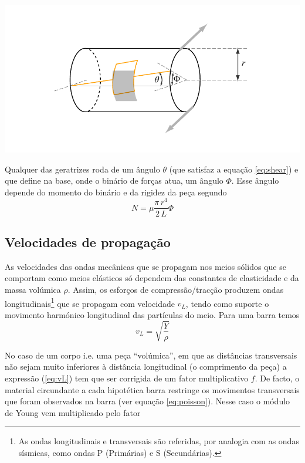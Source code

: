 \documentclass[a4paper,12pt]{article}
\begin{document}
\begin{center}
	\includegraphics[width=0.7\linewidth]{rotac2}
\end{center}

Qualquer das geratrizes roda de um ângulo $\theta$ (que satisfaz a equação 	\ref{eq:shear}) e que define na base, onde o binário de forças atua, um ângulo $\Phi$. Esse ângulo depende do momento do binário e da rigidez da peça segundo 
\begin{equation}
	\label{eq:binario}
	 N= \mu \frac{\pi\,r^4}{2\,L} \Phi 
\end{equation}

\subsection{\sf Velocidades de propagação  }

As velocidades das ondas mecânicas que se propagam nos meios sólidos que se comportam como meios elásticos só dependem das constantes de elasticidade e da massa volúmica $\rho$.
Assim, os esforços de compressão/tracção produzem ondas longitudinais\footnote{As ondas longitudinais e transversais são referidas, por analogia com as ondas sísmicas, como ondas P (Primárias) e S (Secundárias).} 
que se propagam com velocidade $v_L$, tendo como suporte o movimento harmónico longitudinal das partículas do meio. Para uma barra temos
\begin{equation}
	\label{eq:vL}
	 v_L = \sqrt{\frac{Y}{\rho}}
\end{equation}

No caso de um corpo i.e. uma peça “volúmica”, em que as distâncias transversais não sejam muito inferiores à distância longitudinal (o comprimento da peça) a expressão (\ref{eq:vL}) tem que ser corrigida de um fator multiplicativo $f$. De facto, o material circundante a cada hipotética barra restringe os movimentos transversais que foram observados na barra (ver equação \ref{eq:poisson}). Nesse caso o módulo de Young vem multiplicado pelo fator
\end{document}
